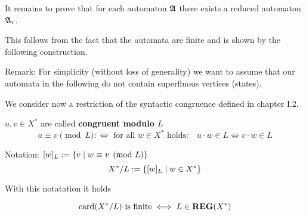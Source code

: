 It remains to prove that for each automaton $\mbox{$\mathfrak{A}$}$ there exists a reduced
automaton $\mbox{$\mathfrak{A}$}_r$.

This follows from the fact that the automata are finite and is shown by the
following construction.

Remark: For simplicity (without loss of generality) we want to assume that our
automata in the following do not contain superfluous vertices (states).

\bigskip
We consider now a restriction of the syntactic congruence defined in chapter
I.2.

\begin{definition}
$u, v \in X^*$ are called {\bf congruent modulo $L$} 
\[ u \equiv v\pmod{L} :\iff \text{ for all } w \in X^* \text{ holds:}\quad u
\cdot w \in L \Leftrightarrow v \cdot w \in L \]
\end{definition}

Notation: $[w]_L := \mbox{$\{v \mid w \equiv v\pmod{L}\}$}$
\[ X^*/L := \mbox{$\{[w]_L \mid w \in X^*\}$} \]

With this notatation it holds

\begin{lemma}
\[ \mathrm{card}({X^*/L}) \text{ is finite} \iff L \in \mbox{{\bf REG}}(X^*) \]
\end{lemma}

